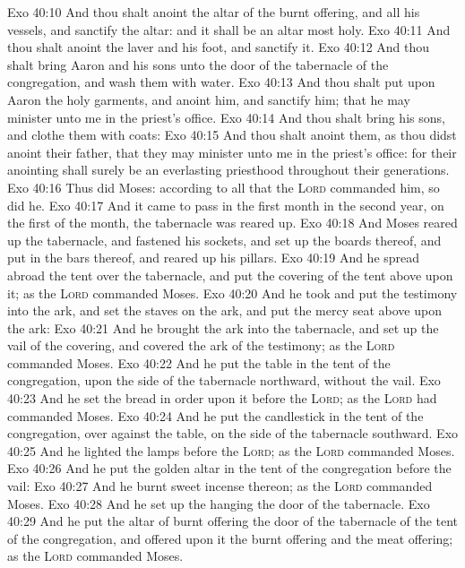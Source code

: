\vs Exo 40:10 And thou shalt anoint the altar of the burnt offering, and all his vessels, and sanctify the altar: and it shall be an altar most holy.
\vs Exo 40:11 And thou shalt anoint the laver and his foot, and sanctify it.
\vs Exo 40:12 And thou shalt bring Aaron and his sons unto the door of the tabernacle of the congregation, and wash them with water.
\vs Exo 40:13 And thou shalt put upon Aaron the holy garments, and anoint him, and sanctify him; that he may minister unto me in the priest's office.
\vs Exo 40:14 And thou shalt bring his sons, and clothe them with coats:
\vs Exo 40:15 And thou shalt anoint them, as thou didst anoint their father, that they may minister unto me in the priest's office: for their anointing shall surely be an everlasting priesthood throughout their generations.
\vs Exo 40:16 Thus did Moses: according to all that the \textsc{Lord} commanded him, so did he.
\vs Exo 40:17 And it came to pass in the first month in the second year, on the first  of the month,  the tabernacle was reared up.
\vs Exo 40:18 And Moses reared up the tabernacle, and fastened his sockets, and set up the boards thereof, and put in the bars thereof, and reared up his pillars.
\vs Exo 40:19 And he spread abroad the tent over the tabernacle, and put the covering of the tent above upon it; as the \textsc{Lord} commanded Moses.
\vs Exo 40:20 And he took and put the testimony into the ark, and set the staves on the ark, and put the mercy seat above upon the ark:
\vs Exo 40:21 And he brought the ark into the tabernacle, and set up the vail of the covering, and covered the ark of the testimony; as the \textsc{Lord} commanded Moses.
\vs Exo 40:22 And he put the table in the tent of the congregation, upon the side of the tabernacle northward, without the vail.
\vs Exo 40:23 And he set the bread in order upon it before the \textsc{Lord}; as the \textsc{Lord} had commanded Moses.
\vs Exo 40:24 And he put the candlestick in the tent of the congregation, over against the table, on the side of the tabernacle southward.
\vs Exo 40:25 And he lighted the lamps before the \textsc{Lord}; as the \textsc{Lord} commanded Moses.
\vs Exo 40:26 And he put the golden altar in the tent of the congregation before the vail:
\vs Exo 40:27 And he burnt sweet incense thereon; as the \textsc{Lord} commanded Moses.
\vs Exo 40:28 And he set up the hanging  the door of the tabernacle.
\vs Exo 40:29 And he put the altar of burnt offering  the door of the tabernacle of the tent of the congregation, and offered upon it the burnt offering and the meat offering; as the \textsc{Lord} commanded Moses.

